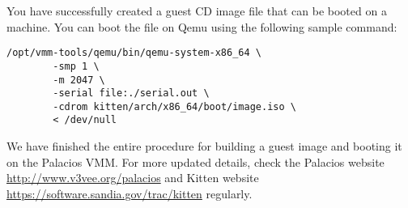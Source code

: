 \documentclass{article}[11pt]
\begin{document}
\pagebreak
\noindent
You have successfully created a guest CD image file that can be booted on a
machine. You can boot the file on Qemu using the following sample command:

\begin{verbatim}
/opt/vmm-tools/qemu/bin/qemu-system-x86_64 \
        -smp 1 \
        -m 2047 \
        -serial file:./serial.out \
        -cdrom kitten/arch/x86_64/boot/image.iso \
        < /dev/null
\end{verbatim}

\vspace{10pt}
\noindent
We have finished the entire procedure for building a guest image and booting it
on the Palacios VMM. For more updated details, check the Palacios website
\url{http://www.v3vee.org/palacios} and Kitten website
\url{https://software.sandia.gov/trac/kitten} regularly.
\end{document}
